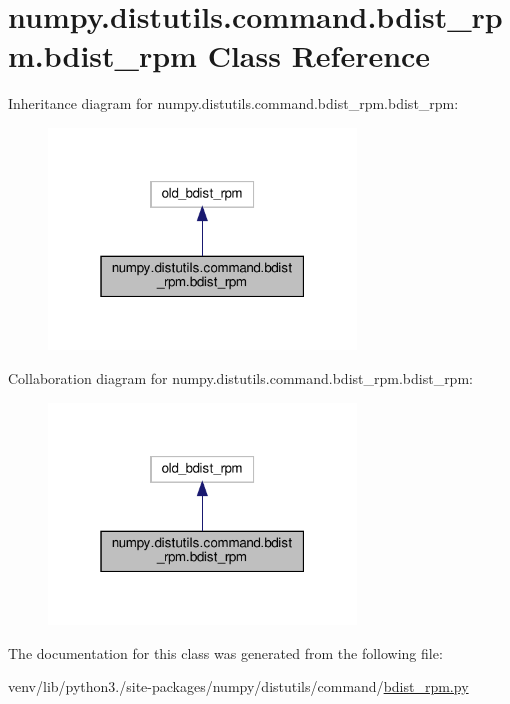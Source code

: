 \hypertarget{classnumpy_1_1distutils_1_1command_1_1bdist__rpm_1_1bdist__rpm}{}\section{numpy.\+distutils.\+command.\+bdist\+\_\+rpm.\+bdist\+\_\+rpm Class Reference}
\label{classnumpy_1_1distutils_1_1command_1_1bdist__rpm_1_1bdist__rpm}


Inheritance diagram for numpy.\+distutils.\+command.\+bdist\+\_\+rpm.\+bdist\+\_\+rpm\+:
\nopagebreak
\begin{figure}[H]
\begin{center}
\leavevmode
\includegraphics[width=232pt]{classnumpy_1_1distutils_1_1command_1_1bdist__rpm_1_1bdist__rpm__inherit__graph}
\end{center}
\end{figure}


Collaboration diagram for numpy.\+distutils.\+command.\+bdist\+\_\+rpm.\+bdist\+\_\+rpm\+:
\nopagebreak
\begin{figure}[H]
\begin{center}
\leavevmode
\includegraphics[width=232pt]{classnumpy_1_1distutils_1_1command_1_1bdist__rpm_1_1bdist__rpm__coll__graph}
\end{center}
\end{figure}


The documentation for this class was generated from the following file\+:\begin{DoxyCompactItemize}
\item 
venv/lib/python3./site-\/packages/numpy/distutils/command/\hyperlink{numpy_2distutils_2command_2bdist__rpm_8py}{bdist\+\_\+rpm.\+py}\end{DoxyCompactItemize}
